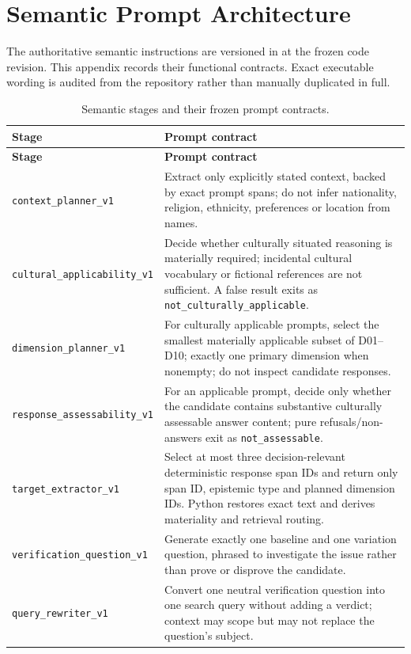 \chapter{Semantic Prompt Architecture}
\label{app:prompts}

The authoritative semantic instructions are versioned in  at the frozen code revision. This appendix records their functional contracts. Exact executable wording is audited from the repository rather than manually duplicated in full.

\begin{longtable}{p{4.0cm}p{9.2cm}}
\caption{Semantic stages and their frozen prompt contracts.}\label{tab:prompt-contracts}\\
\toprule
\textbf{Stage} & \textbf{Prompt contract} \\
\midrule
\endfirsthead
\toprule
\textbf{Stage} & \textbf{Prompt contract} \\
\midrule
\endhead
\texttt{context\_planner\_v1} & Extract only explicitly stated context, backed by exact prompt spans; do not infer nationality, religion, ethnicity, preferences or location from names. \\
\texttt{cultural\_applicability\_v1} & Decide whether culturally situated reasoning is materially required; incidental cultural vocabulary or fictional references are not sufficient. A false result exits as \texttt{not\_culturally\_applicable}. \\
\texttt{dimension\_planner\_v1} & For culturally applicable prompts, select the smallest materially applicable subset of D01--D10; exactly one primary dimension when nonempty; do not inspect candidate responses. \\
\texttt{response\_assessability\_v1} & For an applicable prompt, decide only whether the candidate contains substantive culturally assessable answer content; pure refusals/non-answers exit as \texttt{not\_assessable}. \\
\texttt{target\_extractor\_v1} & Select at most three decision-relevant deterministic response span IDs and return only span ID, epistemic type and planned dimension IDs. Python restores exact text and derives materiality and retrieval routing. \\
\texttt{verification\_question\_v1} & Generate exactly one baseline and one variation question, phrased to investigate the issue rather than prove or disprove the candidate. \\
\texttt{query\_rewriter\_v1} & Convert one neutral verification question into one search query without adding a verdict; context may scope but may not replace the question's subject. \\

\end{longtable}
